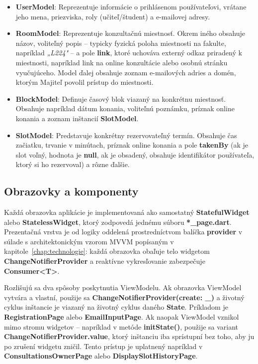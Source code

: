 \begin{itemize}
    \item \textbf{UserModel}: Reprezentuje informácie o prihlásenom používateľovi, vrátane jeho mena, priezviska, roly (učiteľ/študent) a e-mailovej adresy.
    \item \textbf{RoomModel}: Reprezentuje konzultačnú miestnosť.
    Okrem iného obsahuje názov,
    voliteľný popis – typicky fyzická poloha
    miestnosti na fakulte, napríklad \textit{„L224"} – a pole
    \textbf{link}, ktoré uchováva externý odkaz
    priradený k miestnosti, napríklad link na online konzultácie alebo
    osobnú stránku vyučujúceho. Model ďalej obsahuje zoznam e-mailových adries a domén, ktorým Majiteľ povolil prístup do miestnosti.
    \item \textbf{BlockModel}: Definuje časový blok viazaný na
    konkrétnu miestnosť. Obsahuje napríklad dátum konania,
    voliteľnú poznámku, príznak
    online konania a zoznam inštancií
    \textbf{SlotModel}.
     \item \textbf{SlotModel}: Predstavuje konkrétny rezervovateľný termín. Obsahuje čas začiatku,
    trvanie v minútach, príznak online konania a pole \textbf{takenBy} (ak je slot voľný,
    hodnota je \textbf{null}, ak je obsadený, obsahuje identifikátor
    používateľa, ktorý si ho rezervoval) a rôzne ďalšie.
\end{itemize}

\subsection{Obrazovky a komponenty}

Každá obrazovka aplikácie je implementovaná ako samostatný
\textbf{StatefulWidget} alebo \textbf{StatelessWidget}, ktorý zodpovedá
jednému súboru \textbf{*\_page.dart}. Prezentačná vrstva je od logiky oddelená
prostredníctvom balíčka \textbf{provider} v súlade s architektonickým vzorom
MVVM popísaným v kapitole~\ref{chap:technologie}: každá obrazovka obaľuje telo
widgetom \textbf{ChangeNotifierProvider} a reaktívne vykresľovanie zabezpečuje
\textbf{Consumer<T>}.

Rozlišujú sa dva spôsoby poskytnutia ViewModelu. Ak obrazovka ViewModel vytvára a vlastní, použije sa \textbf{ChangeNotifierProvider(create: \_)} a životný cyklus inštancie je viazaný na životný cyklus daného \textbf{State}. Príkladom je \textbf{RegistrationPage} alebo \textbf{EmailInputPage}. Ak naopak ViewModel vznikol mimo stromu widgetov – napríklad v metóde \textbf{initState()}, použije sa variant \textbf{ChangeNotifierProvider.value}, ktorý inštanciu iba sprístupní bez toho, aby ju po zrušení widgetu zničil. Tento prístup je uplatnený napríklad v \textbf{ConsultationsOwnerPage} alebo \textbf{DisplaySlotHistoryPage}.

